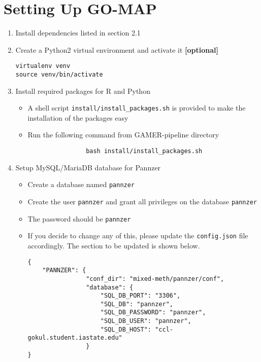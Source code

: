 \section{Setting Up GO-MAP}
\begin{enumerate}
    \item Install dependencies listed in section 2.1
    \item Create a Python2 virtual environment and activate it \textbf{[optional]}
        \begin{verbatim}
virtualenv venv
source venv/bin/activate
        \end{verbatim}
    \item Install required packages for R and Python
        \begin{itemize}
            \item A shell script \texttt{install/install_packages.sh} is provided to make the installation of the packages easy
            \item Run the following command from GAMER-pipeline directory
            \begin{verbatim}
                bash install/install_packages.sh
            \end{verbatim}
            
        \end{itemize}
    \item Setup MySQL/MariaDB database for Pannzer
        \begin{itemize}
            \item Create a database named \texttt{pannzer}
            \item Create the user \texttt{pannzer} and grant all privileges on the database \texttt{pannzer}
            \item The password should be \texttt{pannzer}
            \item If you decide to change any of this, please update the \texttt{config.json} file accordingly. The section to be updated is shown below.
            \begin{verbatim}
{
    "PANNZER": {
                "conf_dir": "mixed-meth/pannzer/conf", 
                "database": {
                    "SQL_DB_PORT": "3306", 
                    "SQL_DB": "pannzer", 
                    "SQL_DB_PASSWORD": "pannzer", 
                    "SQL_DB_USER": "pannzer", 
                    "SQL_DB_HOST": "ccl-gokul.student.iastate.edu"
                }
}
\end{verbatim}
        \end{itemize}
\end{enumerate}
